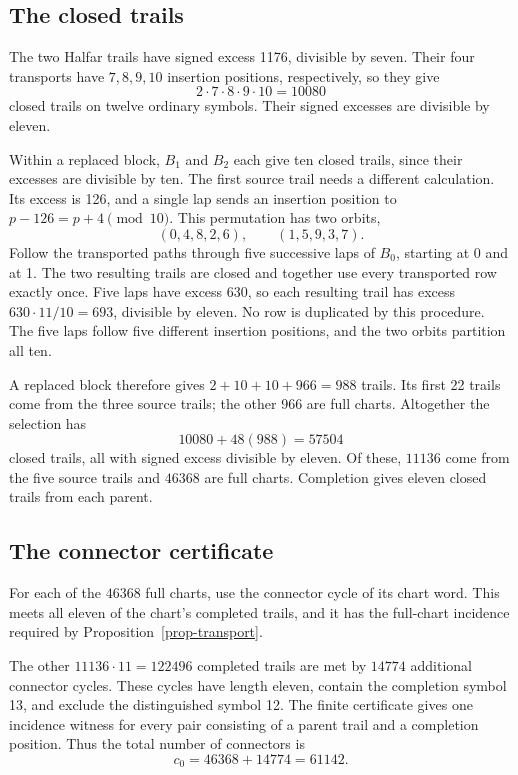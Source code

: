 \documentclass[11pt]{article}
\begin{document}
\subsection{The closed trails}

The two Halfar trails have signed excess 1176, divisible by seven.
Their four transports have $7,8,9,10$ insertion positions, respectively,
so they give
\[
 2\cdot7\cdot8\cdot9\cdot10=\num{10080}
\]
closed trails on twelve ordinary symbols. Their signed excesses are
divisible by eleven.

Within a replaced block, $B_1$ and $B_2$ each give ten closed trails,
since their excesses are divisible by ten. The first source trail needs
a different calculation. Its excess is 126, and a single lap sends an
insertion position to $p-126=p+4\pmod{10}$. This permutation has two
orbits,
\[
 (0,4,8,2,6),\qquad (1,5,9,3,7).
\]
Follow the transported paths through five successive laps of $B_0$,
starting at 0 and at 1. The two resulting trails are closed and together
use every transported row exactly once. Five laps have excess 630, so
each resulting trail has excess $630\cdot11/10=693$, divisible by eleven.
No row is duplicated by this procedure. The five laps follow five
different insertion positions, and the two orbits partition all ten.

A replaced block therefore gives $2+10+10+966=988$ trails. Its first
22 trails come from the three source trails; the other 966 are full
charts. Altogether the selection has
\[
 \num{10080}+48(988)=\num{57504}
\]
closed trails, all with signed excess divisible by eleven. Of these,
$\num{11136}$ come from the five source trails and $\num{46368}$ are
full charts. Completion gives eleven closed trails from each parent.

\subsection{The connector certificate}

For each of the $\num{46368}$ full charts, use the connector cycle of
its chart word. This meets all eleven of the chart's completed trails,
and it has the full-chart incidence required by
Proposition~\ref{prop-transport}.

The other $\num{11136}\cdot11=\num{122496}$ completed trails are met by
$\num{14774}$ additional connector cycles. These cycles have length eleven,
contain the completion symbol 13, and exclude the distinguished symbol 12.
The finite certificate gives one incidence witness for every pair
consisting of a parent trail and a completion position. Thus the total
number of connectors is
\[
 c_0=\num{46368}+\num{14774}=\num{61142}.
\]
\end{document}
